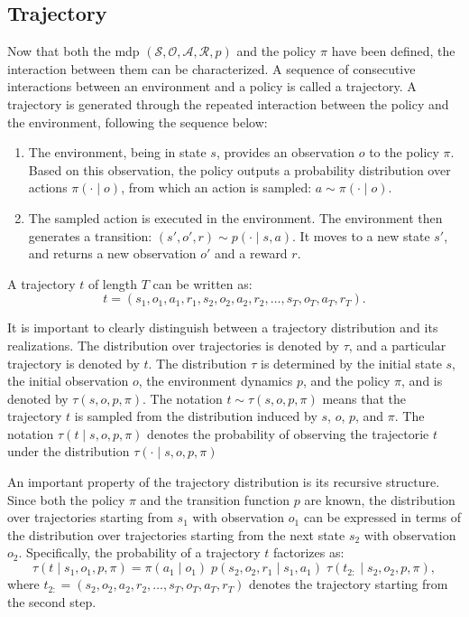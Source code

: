 \subsection{Trajectory}
\label{subsec:trajectory}

Now that both the \gls{mdp} \((\mathcal{S}, \mathcal{O}, \mathcal{A}, \mathcal{R}, p)\) and the policy \(\pi\) have been defined, the interaction between them can be characterized.  
A sequence of consecutive interactions between an environment and a policy is called a trajectory.  
A trajectory is generated through the repeated interaction between the policy and the environment, following the sequence below:
\begin{enumerate}
    \item The environment, being in state \(s\), provides an observation \(o\) to the policy \(\pi\).
    Based on this observation, the policy outputs a probability distribution over actions \(\pi(\cdot \mid o)\), from which an action is sampled:
    \(
    a \sim \pi(\cdot \mid o).
    \)

    \item The sampled action is executed in the environment. The environment then generates a transition:
    \(
    (s', o', r) \sim p(\cdot \mid s, a).
    \)
    It moves to a new state \(s'\), and returns a new observation \(o'\) and a reward \(r\).
\end{enumerate}

A trajectory \(t\) of length \(T\) can be written as:
\[
t = (s_1, o_1, a_1, r_1, s_2, o_2, a_2, r_2, \ldots, s_T, o_T, a_T, r_T).
\]

It is important to clearly distinguish between a trajectory distribution and its realizations.  
The distribution over trajectories is denoted by \(\tau\), and a particular trajectory is denoted by \(t\).
The distribution \(\tau\) is determined by the initial state \(s\), the initial observation \(o\), the environment dynamics \(p\), and the policy \(\pi\), and is denoted by \(\tau(s, o, p, \pi)\).
The notation \(t \sim \tau(s, o, p, \pi)\) means that the trajectory \(t\) is sampled from the distribution induced by \(s\), \(o\), \(p\), and \(\pi\).
The notation \(\tau(t \mid s, o, p, \pi)\) denotes the probability of observing the trajectorie \(t\) under the distribution \(\tau(\cdot \mid s, o, p, \pi)\)

An important property of the trajectory distribution is its recursive structure.
Since both the policy \(\pi\) and the transition function \(p\) are known, the distribution over trajectories starting from \(s_1\) with observation \(o_1\) can be expressed in terms of the distribution over trajectories starting from the next state \(s_2\) with observation \(o_2\).
Specifically, the probability of a trajectory \(t\) factorizes as:
\[
\tau(t \mid s_1, o_1, p, \pi) = \pi(a_1 \mid o_1) \; p(s_2, o_2, r_1 \mid s_1, a_1) \; \tau(t_{2:} \mid s_2, o_2, p, \pi),
\]
where \(t_{2:} = (s_2, o_2, a_2, r_2, \ldots, s_T, o_T, a_T, r_T)\) denotes the trajectory starting from the second step.

